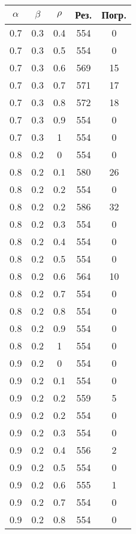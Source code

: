 \begin{table}[!h]
	\begin{center}
		\begin{tabular}{|c|c|c|c|c|}
			\hline
			$\alpha$        & $\beta$      & $\rho$      &Рез.  & Погр. \\
			\hline
			0.7  & 0.3  & 0.4  & 554  & 0   \\
			0.7  & 0.3  & 0.5  & 554  & 0   \\
			0.7  & 0.3  & 0.6  & 569  & 15     \\
			0.7  & 0.3  & 0.7  & 571  & 17     \\
			0.7  & 0.3  & 0.8  & 572  & 18     \\
			0.7  & 0.3  & 0.9  & 554  & 0     \\
			0.7  & 0.3  & 1    & 554  & 0     \\ \hline
			0.8  & 0.2  & 0    & 554  & 0   \\
			0.8  & 0.2  & 0.1  & 580  & 26  \\
			0.8  & 0.2  & 0.2  & 554  & 0     \\
			0.8  & 0.2  & 0.2  & 586  & 32     \\
			0.8  & 0.2  & 0.3  & 554  & 0     \\
			0.8  & 0.2  & 0.4  & 554  & 0   \\
			0.8  & 0.2  & 0.5  & 554  & 0   \\
			0.8  & 0.2  & 0.6  & 564  & 10   \\
			0.8  & 0.2  & 0.7  & 554  & 0   \\
			0.8  & 0.2  & 0.8  & 554  & 0   \\
			0.8  & 0.2  & 0.9  & 554  & 0   \\
			0.8  & 0.2  & 1    & 554  & 0    \\ \hline
			0.9  & 0.2  & 0    & 554  & 0   \\
			0.9  & 0.2  & 0.1  & 554  & 0   \\
			0.9  & 0.2  & 0.2  & 559  & 5     \\
			0.9  & 0.2  & 0.2  & 554  & 0     \\
			0.9  & 0.2  & 0.3  & 554  & 0     \\
			0.9  & 0.2  & 0.4  & 556  & 2   \\
			0.9  & 0.2  & 0.5  & 554  & 0   \\
			0.9  & 0.2  & 0.6  & 555  & 1   \\
			0.9  & 0.2  & 0.7  & 554  & 0   \\
			0.9  & 0.2  & 0.8  & 554  & 0   \\

\end{tabular}
\end{center}
\end{table}
